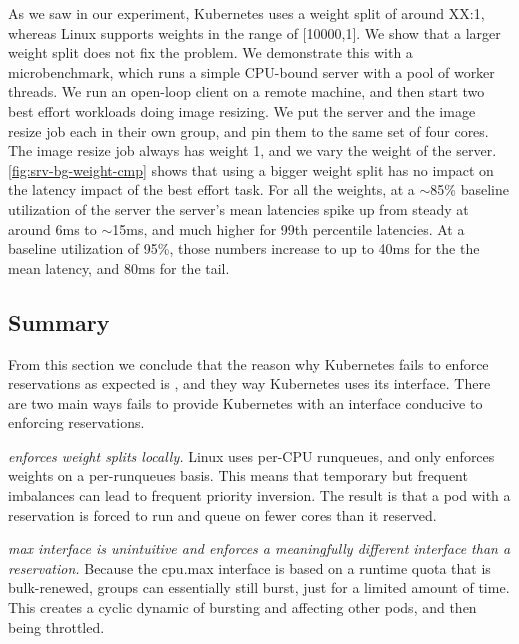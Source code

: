 As we saw in our experiment, Kubernetes uses a weight split of around XX:1,
whereas Linux supports weights in the range of [10000,1]. We show that a larger
weight split does not fix the problem. We demonstrate this with a
microbenchmark, which runs a simple CPU-bound server with a pool of worker
threads. We run an open-loop client on a remote machine, and then start two best
effort workloads doing image resizing. We put the server and the image resize
job each in their own \cgroups{} group, and pin them to the same set of four
cores. The image resize job always has weight 1, and we vary the weight of the
server. \autoref{fig:srv-bg-weight-cmp} shows that using a bigger weight split
has no impact on the latency impact of the best effort task. For all the
weights, at a $\sim$85\% baseline utilization of the server the server's mean
latencies spike up from steady at around 6ms to $\sim$15ms, and much higher for
99th percentile latencies. At a baseline utilization of 95\%, those numbers
increase to up to 40ms for the the mean latency, and 80ms for the tail.

\subsection{Summary}

From this section we conclude that the reason why Kubernetes fails to enforce
reservations as expected is \cgroups{}, and they way Kubernetes uses its
interface. There are two main ways \cgroups{} fails to provide Kubernetes with
an interface conducive to enforcing reservations.

\textit{\cgroups{} enforces weight splits locally.} Linux uses per-CPU
runqueues, and only enforces weights on a per-runqueues basis. This means that
temporary but frequent imbalances can lead to frequent priority inversion. The
result is that a pod with a reservation is forced to run and queue on fewer
cores than it reserved.

\textit{\cgroups{} max interface is unintuitive and enforces a meaningfully
different interface than a reservation.} Because the cpu.max interface is based
on a runtime quota that is bulk-renewed, groups can essentially still burst,
just for a limited amount of time. This creates a cyclic dynamic of bursting and
affecting other pods, and then being throttled.




